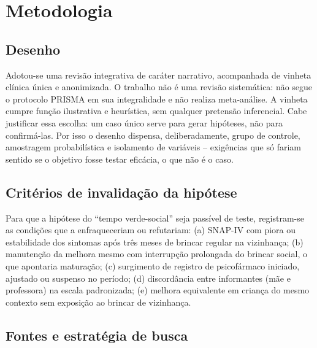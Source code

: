 \section{Metodologia}

\subsection{Desenho}

Adotou-se uma revis\~ao integrativa de car\'ater narrativo, acompanhada de vinheta cl\'inica \'unica e anonimizada. O trabalho n\~ao \'e uma revis\~ao sistem\'atica: n\~ao segue o protocolo PRISMA em sua integralidade e n\~ao realiza meta-an\'alise. A vinheta cumpre fun\c{c}\~ao ilustrativa e heur\'istica, sem qualquer pretens\~ao inferencial. Cabe justificar essa escolha: um caso \'unico serve para gerar hip\'oteses, n\~ao para confirm\'a-las. Por isso o desenho dispensa, deliberadamente, grupo de controle, amostragem probabil\'istica e isolamento de vari\'aveis -- exig\^encias que s\'o fariam sentido se o objetivo fosse testar efic\'acia, o que n\~ao \'e o caso.

\subsection{Crit\'erios de invalida\c{c}\~ao da hip\'otese}

Para que a hip\'otese do ``tempo verde-social'' seja pass\'ivel de teste, registram-se as condi\c{c}\~oes que a enfraqueceriam ou refutariam: (a) SNAP-IV com piora ou estabilidade dos sintomas ap\'os tr\^es meses de brincar regular na vizinhan\c{c}a; (b) manuten\c{c}\~ao da melhora mesmo com interrup\c{c}\~ao prolongada do brincar social, o que apontaria matura\c{c}\~ao; (c) surgimento de registro de psicof\'armaco iniciado, ajustado ou suspenso no per\'iodo; (d) discord\^ancia entre informantes (m\~ae e professora) na escala padronizada; (e) melhora equivalente em crian\c{c}a do mesmo contexto sem exposi\c{c}\~ao ao brincar de vizinhan\c{c}a.

\subsection{Fontes e estrat\'egia de busca}

